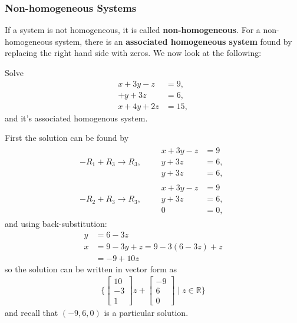 \subsubsection{Non-homogeneous Systems}

If a system is not homogeneous, it is called \textbf{non-homogeneous}.   For a non-homo\-gen\-eous system, there is an \textbf{associated homogeneous system} found by replacing the right hand side with zeros.    We now look at the following:
%
\begin{example} \label{ex:nh:and:homo}
Solve
%
\begin{align*}
x + 3y -z & = 9, \\
   + y + 3z & = 6, \\
x+4y +2z & = 15,
\end{align*}
and it's associated homogenous system.

\solution

First the solution can be found by
%
\begin{align*}
-R_1+R_3 \rightarrow R_3, \qquad
\begin{split}
x + 3y - z & = 9 \\
y + 3z & = 6, \\
y + 3z & = 6,
\end{split} \\[12pt]
-R_2 + R_3 \rightarrow R_3, \qquad
\begin{split}
x + 3y - z & = 9 \\
y + 3z & = 6, \\
0 & = 0,
\end{split}
\end{align*}
and using back-substitution:
%
\begin{align*}
y & = 6-3z\\
x & = 9 -3y + z = 9 - 3(6-3z) + z \\
& = -9 +10z
\end{align*}
so the solution can be written in vector form as
\begin{align*}
\{ \begin{bmatrix}
10 \\ -3 \\ 1
\end{bmatrix} z + \begin{bmatrix}
-9 \\ 6 \\ 0
\end{bmatrix} \; | \; z \in \mathbb{R} \}
\end{align*}
and recall that $(-9,6,0)$ is a particular solution.


\end{example}
